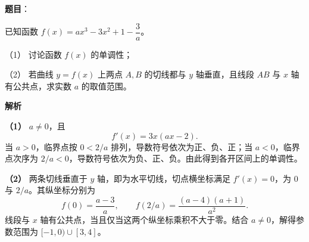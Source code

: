 \begin{answer}

\textbf{题目}：

已知函数 $f(x)=ax^3-3x^2+1-\dfrac3a$。

（1） 讨论函数 $f(x)$ 的单调性；

（2） 若曲线 $y=f(x)$ 上两点 $A,B$ 的切线都与 $y$ 轴垂直，且线段 $AB$ 与 $x$ 轴有公共点，求实数 $a$ 的取值范围。

\textbf{解析}

\textbf{（1）} $a\ne0$，且
\nopagebreak[4]
\[
f'(x)=3x(ax-2).
\]
当 $a>0$，临界点按 $0<2/a$ 排列，导数符号依次为正、负、正；当 $a<0$，临界点次序为 $2/a<0$，导数符号依次为负、正、负。由此得到各开区间上的单调性。

\textbf{（2）} 两条切线垂直于 $y$ 轴，即为水平切线，切点横坐标满足 $f'(x)=0$，为 $0$ 与 $2/a$。其纵坐标分别为
\nopagebreak[4]
\[
f(0)=\frac{a-3}{a},\qquad f(2/a)=\frac{(a-4)(a+1)}{a^2}.
\]
线段与 $x$ 轴有公共点，当且仅当这两个纵坐标乘积不大于零。结合 $a\ne0$，解得参数范围为 $[-1,0)\cup[3,4]$。


\gkanswer{答案（2）：$a\in[-1,0)\cup[3,4]$。}

\end{answer}
